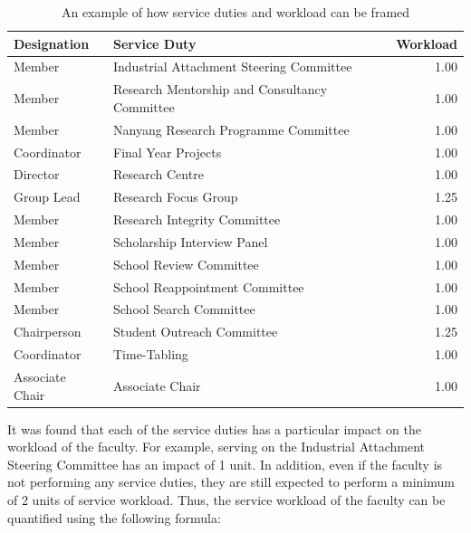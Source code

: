 \begin{table}[htpb]
  \centering
  \begin{tabular}{|l | l | r |}
    \hline
    Designation     & Service Duty                                  & Workload \\
    \hline
    Member          & Industrial Attachment Steering Committee      & 1.00     \\
    Member          & Research Mentorship and Consultancy Committee & 1.00     \\
    Member          & Nanyang Research Programme Committee          & 1.00     \\
    Coordinator     & Final Year Projects                           & 1.00     \\
    Director        & Research Centre                               & 1.00     \\
    Group Lead      & Research Focus Group                          & 1.25     \\
    Member          & Research Integrity Committee                  & 1.00     \\
    Member          & Scholarship Interview Panel                   & 1.00     \\
    Member          & School Review Committee                       & 1.00     \\
    Member          & School Reappointment Committee                & 1.00     \\
    Member          & School Search Committee                       & 1.00     \\
    Chairperson     & Student Outreach Committee                    & 1.25     \\
    Coordinator     & Time-Tabling                                  & 1.00     \\
    Associate Chair & Associate Chair                               & 1.00     \\
    \hline
  \end{tabular}
  \caption{An example of how service duties and workload can be framed}
  \label{tab:service_duties}
\end{table}


It was found that each of the service duties has a particular impact on the workload of the faculty. For example, serving on the Industrial Attachment Steering Committee has an impact of 1 unit. In addition, even if the faculty is not performing any service duties, they are still expected to perform a minimum of 2 units of service workload. Thus, the service workload of the faculty can be quantified using the following formula:

